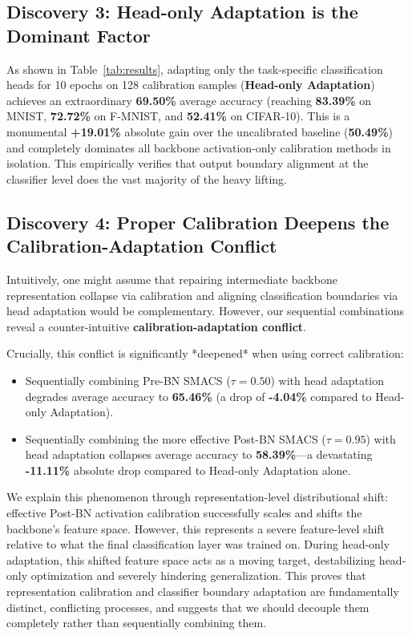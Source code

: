 \documentclass{article}
\theoremstyle{plain}
\theoremstyle{definition}
\theoremstyle{remark}
\begin{document}
\subsection{Discovery 3: Head-only Adaptation is the Dominant Factor}
As shown in Table~\ref{tab:results}, adapting only the task-specific classification heads for 10 epochs on 128 calibration samples (\textbf{Head-only Adaptation}) achieves an extraordinary \textbf{69.50\%} average accuracy (reaching \textbf{83.39\%} on MNIST, \textbf{72.72\%} on F-MNIST, and \textbf{52.41\%} on CIFAR-10). This is a monumental \textbf{+19.01\%} absolute gain over the uncalibrated baseline (\textbf{50.49\%}) and completely dominates all backbone activation-only calibration methods in isolation. This empirically verifies that output boundary alignment at the classifier level does the vast majority of the heavy lifting.

\subsection{Discovery 4: Proper Calibration Deepens the Calibration-Adaptation Conflict}
Intuitively, one might assume that repairing intermediate backbone representation collapse via calibration and aligning classification boundaries via head adaptation would be complementary. However, our sequential combinations reveal a counter-intuitive \textbf{calibration-adaptation conflict}.

Crucially, this conflict is significantly *deepened* when using correct calibration:
\begin{itemize}
    \item Sequentially combining Pre-BN SMACS ($\tau=0.50$) with head adaptation degrades average accuracy to \textbf{65.46\%} (a drop of \textbf{-4.04\%} compared to Head-only Adaptation).
    \item Sequentially combining the more effective Post-BN SMACS ($\tau=0.95$) with head adaptation collapses average accuracy to \textbf{58.39\%}—a devastating \textbf{-11.11\%} absolute drop compared to Head-only Adaptation alone.
\end{itemize}
We explain this phenomenon through representation-level distributional shift: effective Post-BN activation calibration successfully scales and shifts the backbone's feature space. However, this represents a severe feature-level shift relative to what the final classification layer was trained on. During head-only adaptation, this shifted feature space acts as a moving target, destabilizing head-only optimization and severely hindering generalization. This proves that representation calibration and classifier boundary adaptation are fundamentally distinct, conflicting processes, and suggests that we should decouple them completely rather than sequentially combining them.
\end{document}
